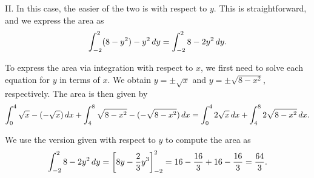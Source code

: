 \documentclass[]{ximera}
\begin{document}
\begin{freeResponse}
II. In this case, the easier of the two is with respect to $y$. This is straightforward, and we express the area as 
$$
\int_{-2}^2 (8-y^2) - y^2 \mathop{}\!d y = \int_{-2}^2 8 - 2y^2 \mathop{}\!d y.
$$

To express the area via integration with respect to $x$, we first need to solve each equation for $y$ in terms of $x$. We obtain $y=\pm \sqrt{x}$ and $y=\pm\sqrt{8-x^2}$, respectively. The area is then given by
$$
\int_0^4 \sqrt{x} - (-\sqrt{x}) \mathop{}\!d x + \int_4^8 \sqrt{8-x^2} - (-\sqrt{8-x^2}) \mathop{}\!d x = \int_0^4 2 \sqrt{x} \mathop{}\!d x + \int_4^8 2 \sqrt{8-x^2} \mathop{}\!d x.
$$

We use the version given with respect to $y$ to compute the area as
$$
\int_{-2}^2 8 - 2y^2 \mathop{}\!d y = \bigg[ 8y - \frac{2}{3} y^3 \bigg]_{-2}^2  = 16 - \frac{16}{3} + 16 - \frac{16}{3} = \frac{64}{3}.
$$
\end{freeResponse}

%
%                      
%	                            
%                                   
%	    
%            
%
%
\end{document}
